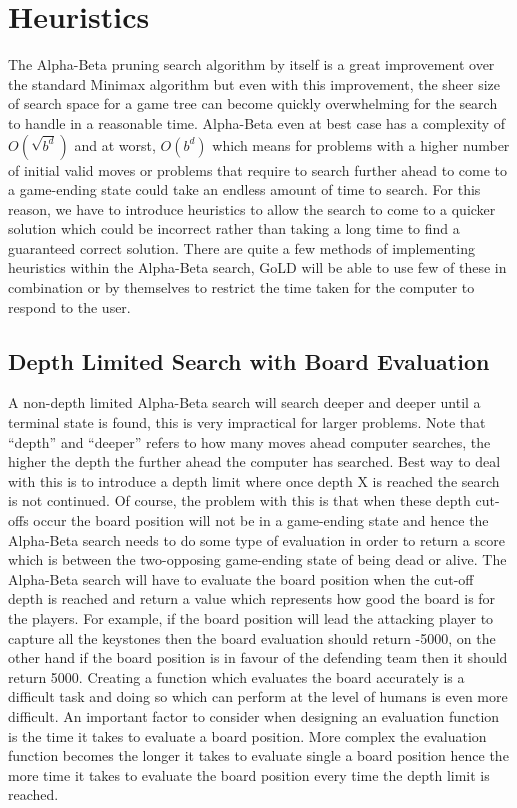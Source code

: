 \documentclass{l4proj}
\begin{document}
\section{Heuristics}

The Alpha-Beta pruning search algorithm by itself is a great improvement over the standard Minimax algorithm but even with this improvement, the sheer size of search space for a game tree can become quickly overwhelming for the search to handle in a reasonable time. Alpha-Beta even at best case has a complexity of $O(\sqrt{b^d})$ and at worst, $O(b^d)$  which means for problems with a higher number of initial valid moves or problems that require to search further ahead to come to a game-ending state could take an endless amount of time to search. For this reason, we have to introduce heuristics to allow the search to come to a quicker solution which could be incorrect rather than taking a long time to find a guaranteed correct solution. There are quite a few methods of implementing heuristics within the Alpha-Beta search, GoLD will be able to use few of these in combination or by themselves to restrict the time taken for the computer to respond to the user.

\subsection{Depth Limited Search with Board Evaluation}
A non-depth limited Alpha-Beta search will search deeper and deeper until a terminal state is found, this is very impractical for larger problems. Note that “depth” and “deeper” refers to how many moves ahead computer searches, the higher the depth the further ahead the computer has searched. Best way to deal with this is to introduce a depth limit where once depth X is reached the search is not continued. Of course, the problem with this is that when these depth cut-offs occur the board position will not be in a game-ending state and hence the Alpha-Beta search needs to do some type of evaluation in order to return a score which is between the two-opposing game-ending state of being dead or alive. The Alpha-Beta search will have to evaluate the board position when the cut-off depth is reached and return a value which represents how good the board is for the players. For example, if the board position will lead the attacking player to capture all the keystones then the board evaluation should return -5000,   on the other hand if the board position is in favour of the defending team then it should return 5000. Creating a function which evaluates the board accurately is a difficult task and doing so which can perform at the level of humans is even more difficult. An important factor to consider when designing an evaluation function is the time it takes to evaluate a board position. More complex the evaluation function becomes the longer it takes to evaluate single a board position hence the more time it takes to evaluate the board position every time the depth limit is reached.
\end{document}

